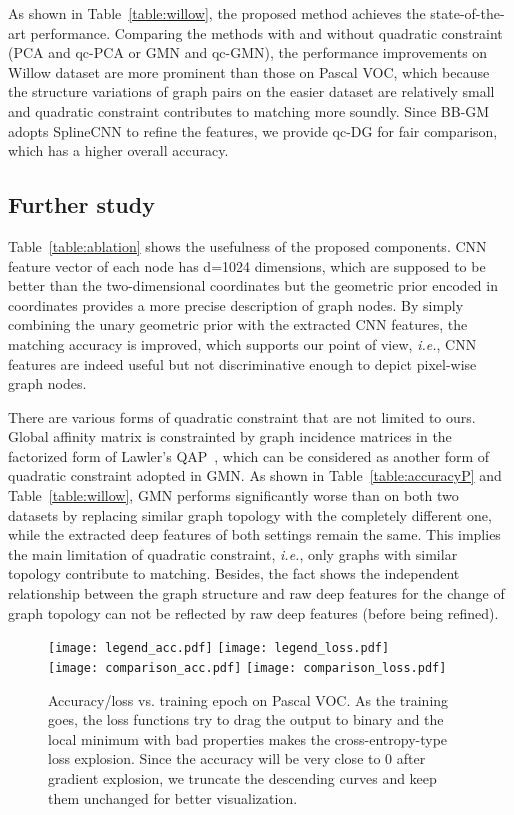 \documentclass[final]{cvpr}
\begin{document}
As shown in Table~\ref{table:willow}, the proposed method achieves the state-of-the-art performance. Comparing the methods with and without quadratic constraint (PCA and qc-PCA or GMN and qc-GMN), the performance improvements on Willow dataset are more prominent than those on Pascal VOC, which because the structure variations of graph pairs on the easier dataset are relatively small and quadratic constraint contributes to matching more soundly. Since BB-GM adopts SplineCNN to refine the features, we provide qc-DG for fair comparison, which has a higher overall accuracy.

\subsection{Further study}
Table~\ref{table:ablation} shows the usefulness of the proposed components. CNN feature vector of each node has d=1024 dimensions, which are supposed to be better than the two-dimensional coordinates but the geometric prior encoded in coordinates provides a more precise description of graph nodes. By simply combining the unary geometric prior with the extracted CNN features, the matching accuracy is improved, which supports our point of view, {\em i.e.}, CNN features are indeed useful but not discriminative enough to depict pixel-wise graph nodes.

 There are various forms of quadratic constraint that are not limited to ours. Global affinity matrix  is constrainted by graph incidence matrices in the factorized form of Lawler's QAP~\cite{lawler1963quadratic,zhou2015factorized}, which can be considered as another form of quadratic constraint adopted in GMN. As shown in Table~\ref{table:accuracyP} and Table~\ref{table:willow}, GMN performs significantly worse than  on both two datasets by replacing similar graph topology with the completely different one, while the extracted deep features of both settings remain the same. This implies the main limitation of quadratic constraint, {\em i.e.}, only graphs with similar topology contribute to matching. Besides, the fact shows the independent relationship between the graph structure and raw deep features for the change of graph topology can not be reflected by raw deep features (before being refined).

\begin{figure}[t!]
\vspace{-1mm}
\centering
  \texttt{[image: legend\_acc.pdf]}
\texttt{[image: legend\_loss.pdf]}\\
   \texttt{[image: comparison\_acc.pdf]}
   \texttt{[image: comparison\_loss.pdf]}
\caption{Accuracy/loss vs. training epoch on Pascal VOC. As the training goes, the loss functions try to drag the output to binary and the local minimum with bad properties makes the cross-entropy-type loss explosion. Since the accuracy will be very close to 0 after gradient explosion, we truncate the descending curves and keep them unchanged for better visualization.}
\label{fig:allcomp}
\end{figure}
\end{document}
